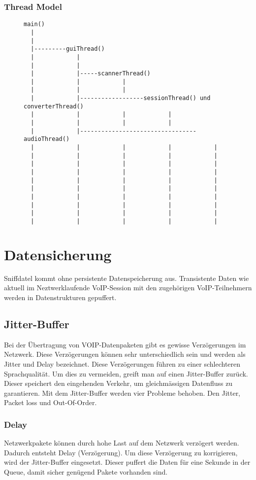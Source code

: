 \documentclass[a4,12pt]{scrartcl}
\begin{document}
\subsubsection{Thread Model}
\begin{figure} [H]
	\begin{center}
\begin{verbatim}
main()
  |
  |
  |---------guiThread()
  |            |
  |            |
  |            |-----scannerThread()
  |            |            |
  |            |            |
  |            |------------------sessionThread() und converterThread()
  |            |            |            |
  |            |            |            |
  |            |---------------------------------audioThread()
  |            |            |            |            |
  |            |            |            |            |
  |            |            |            |            |
  |            |            |            |            |
  |            |            |            |            |
  |            |            |            |            |
  |            |            |            |            |
  |            |            |            |            |
  |            |            |            |            |
  |            |            |            |            |
\end{verbatim}
\end{center}
\end{figure}

\section{Datensicherung}
Sniffdatel kommt ohne persistente Datenspeicherung aus. Transistente Daten wie aktuell im Neztwerklaufende VoIP-Session  mit den zugehörigen VoIP-Teilnehmern werden in Datenstrukturen gepuffert.
\subsection{Jitter-Buffer}
Bei der Übertragung von VOIP-Datenpaketen gibt es gewisse Verzögerungen im Netzwerk. Diese Verzögerungen können sehr unterschiedlich sein und werden als Jitter und Delay bezeichnet. Diese Verzögerungen führen zu einer schlechteren Sprachqualität. Um dies zu vermeiden, greift man auf einen Jitter-Buffer zurück. Dieser speichert den eingehenden Verkehr, um gleichmässigen Datenfluss zu garantieren. 
Mit dem Jitter-Buffer werden vier Probleme behoben. Den Jitter, Packet loss und Out-Of-Order.
\subsubsection{Delay}
Netzwerkpakete können durch hohe Last auf dem Netzwerk verzögert werden. Dadurch entsteht Delay (Verzögerung). Um diese Verzögerung zu korrigieren, wird der Jitter-Buffer eingesetzt. Dieser puffert die Daten für eine Sekunde in der Queue, damit sicher genügend Pakete vorhanden sind.
\end{document}
